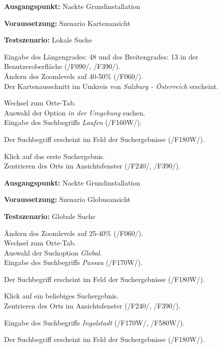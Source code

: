 \documentclass[10pt]{scrreprt}
\newcommand{\sfbf}[1]{\textbf{\sffamily #1}}
\newcommand{\ziel}[1]{{\fontsize{9.5}{11}\textsf{/#1/}}}
\newcommand{\ziellabel}{Z}
\newcommand{\wunsch}{\renewcommand{\labelenumi}{\textbf{\ziel{\ziellabel\numprint{\theenumi}0W}}}}
\newenvironment{details}[1][6pt]{%
  \parskip#1 \parindent6mm \raggedright%
  \def\item{\par\ignorespaces\hangindent=5mm \hangafter1}}{%
  \par\ignorespaces}
\begin{document}
\vspace{1.0cm}
\begin{details}[2pt]
\item \sfbf{Ausgangspunkt:} Nackte Grundinstallation 
\item \sfbf{Voraussetzung:} Szenario Kartenansicht
\item \sfbf{Testszenario:} Lokale Suche
\end{details}
\vspace{2mm}
\begin{enumerate}[leftmargin = 2.2cm, resume]
\item Eingabe des Längengrades: 48 und des Breitengrades: 13 in der Benutzeroberfläche (\ziel{F090}, \ziel{F390}).\\Ändern des Zoomlevels auf 40-50\% (\ziel{F060}).\\Der Kartenausschnitt im Umkreis von \textit{Salzburg - Österreich} erscheint.
\wunsch
\item Wechsel zum Orte-Tab.\\Auswahl der Option \textit{in der Umgebung} suchen.\\Eingabe des Suchbegriffs \textit{Laufen} (\ziel{F160W}).
\item Der Suchbegriff erscheint im Feld der Suchergebnisse (\ziel{F180W}).
\item Klick auf das erste Suchergebnis.\\Zentrieren des Orts im Ansichtsfenster (\ziel{F240}, \ziel{F390}).
\end{enumerate}


\vspace{1.0cm}
\begin{details}[2pt]
\item \sfbf{Ausgangspunkt:} Nackte Grundinstallation 
\item \sfbf{Voraussetzung:} Szenario Globusansicht
\item \sfbf{Testszenario:} Globale Suche
\end{details}
\vspace{2mm}
\begin{enumerate}[leftmargin = 2.2cm, resume]
\wunsch
\item Ändern des Zoomlevels auf 25-40\% (\ziel{F060}).\\Wechsel zum Orte-Tab.\\Auswahl der Suchoption \textit{Global}.\\Eingabe des Suchbegriffs \textit{Passau} (\ziel{F170W}).
\item Der Suchbegriff erscheint im Feld der Suchergebnisse (\ziel{F180W}).
\item Klick auf ein beliebiges Suchergebnis.\\Zentrieren des Orts im Ansichtsfenster (\ziel{F240}, \ziel{F390}).
\item Eingabe des Suchbegriffs \textit{Ingolstadt} (\ziel{F170W}, \ziel{F580W}).
\item Der Suchbegriff erscheint im Feld der Suchergebnisse (\ziel{F180W}).
\end{enumerate}
\end{document}
